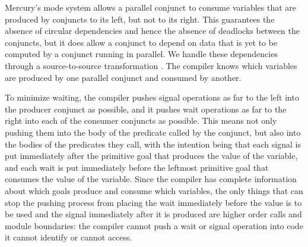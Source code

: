 Mercury's mode system allows a parallel conjunct to consume variables
that are produced by conjuncts to its left, but not to its right.
This guarantees the absence of circular dependencies
and hence the absence of deadlocks between the conjuncts,
but it does allow a conjunct to depend on data that is yet to be computed
by a conjunct running in parallel.
We handle these dependencies through a source-to-source transformation
\cite{wang_dep_par_conj}.
The compiler knows which variables
are produced by one parallel conjunct and consumed by another.

To minimize waiting,
the compiler pushes signal operations
as far to the left into the producer conjunct as possible,
and it pushes wait operations
as far to the right into each of the consumer conjuncts as possible.
This means not only pushing them
into the body of the predicate called by the conjunct,
but also into the bodies of the predicates they call,
with the intention being that
each signal is put immediately after
the primitive goal that produces the value of the variable,
and each wait is put immediately before
the leftmost primitive goal that consumes the value of the variable.
Since the compiler has complete information
about which goals produce and consume which variables,
the only things that can stop the pushing process from placing the
wait immediately before the value is to be used and the signal
immediately after it is produced are
higher order calls and module boundaries:
the compiler cannot push a wait or signal operation
into code it cannot identify or cannot access.

